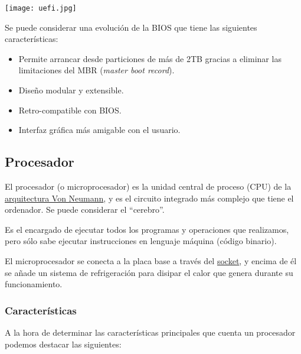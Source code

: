 \begin{center}
    \texttt{[image: uefi.jpg]}
\end{center}

Se puede considerar una evolución de la BIOS  que tiene las siguientes características:

\begin{itemize}
    \item Permite arrancar desde particiones de más de 2TB gracias a eliminar las limitaciones del MBR (\textit{master boot record}).
    \item Diseño modular y extensible.
    \item Retro-compatible con BIOS.
    \item Interfaz gráfica más amigable con el usuario.
\end{itemize}


\subsection{Procesador}
El procesador (o microprocesador) es la unidad central de proceso (CPU) de la \hyperlink{von_neumann}{arquitectura Von Neumann}, y es el  circuito integrado más complejo que tiene el ordenador. Se puede considerar el “cerebro”.

Es el encargado de ejecutar todos los programas y operaciones que realizamos, pero sólo sabe ejecutar instrucciones en lenguaje máquina (código binario).

El microprocesador se conecta a la placa base a través del \hyperlink{socket}{socket}, y encima de él se añade un sistema de refrigeración para disipar el calor que genera durante su funcionamiento.


\subsubsection{Características}
A la hora de determinar las características principales que cuenta un procesador podemos destacar las siguientes:

